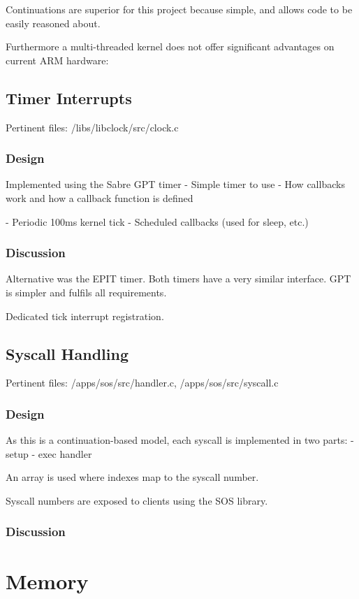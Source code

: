 \documentclass[a4paper,12pt]{article}
\begin{document}
Continuations are superior for this project because simple, and allows code to
be easily reasoned about.

Furthermore a multi-threaded kernel does not offer significant advantages on
current ARM hardware:

\subsection{Timer Interrupts}
Pertinent files: /libs/libclock/src/clock.c

\subsubsection{Design}
Implemented using the Sabre GPT timer
  - Simple timer to use
  - How callbacks work and how a callback function is defined

- Periodic 100ms kernel tick
- Scheduled callbacks (used for sleep, etc.)

\subsubsection{Discussion}
Alternative was the EPIT timer.  Both timers have a very similar interface.
GPT is simpler and fulfils all requirements.

Dedicated tick interrupt registration.

\subsection{Syscall Handling}
Pertinent files: /apps/sos/src/handler.c, /apps/sos/src/syscall.c

\subsubsection{Design}
As this is a continuation-based model, each syscall is implemented in two parts:
 - setup
 - exec handler

An array is used where indexes map to the syscall number.

Syscall numbers are exposed to clients using the SOS library.

\subsubsection{Discussion}

\section{Memory}
\end{document}
